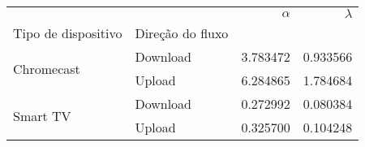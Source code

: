 \begin{tabular}{llrr}
\toprule
 &  & $\alpha$ & $\lambda$ \\
Tipo de dispositivo & Direção do fluxo &  &  \\
\midrule
\multirow[t]{2}{*}{Chromecast} & Download & 3.783472 & 0.933566 \\
 & Upload & 6.284865 & 1.784684 \\
\cline{1-4}
\multirow[t]{2}{*}{Smart TV} & Download & 0.272992 & 0.080384 \\
 & Upload & 0.325700 & 0.104248 \\
\cline{1-4}
\bottomrule
\end{tabular}
